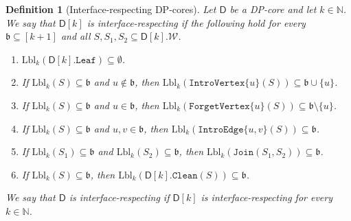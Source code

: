 \documentclass[11pt,a4paper]{article}
\newtheorem{definition}[theorem]{Definition}
\newcommand{\treewidthvalue}{k}
\newcommand{\N}{\mathbb{N}}
\newcommand{\abag}{\mathfrak{b}}
\newcommand{\introvertextype}[1]{\mathtt{IntroVertex}\{#1\}}
\newcommand{\forgetvertextype}[1]{\mathtt{ForgetVertex}\{#1\}}
\newcommand{\jointype}{\mathtt{Join}}
\newcommand{\introedgegeneric}[2]{\mathtt{IntroEdge}\{#1,#2\}}
\newcommand{\initialsetgeneric}{\mathtt{Leaf}}
\newcommand{\cleaningfunctioncore}{\mathtt{Clean}}
\newcommand{\vertexone}{u}
\newcommand{\vertextwo}{v}
\newcommand{\allwitnesses}{\mathcal{W}}
\newcommand{\dpcore}{\mathsf{D}}
\newcommand{\witnessset}{S}
\begin{document}
\begin{definition}[Interface-respecting DP-cores]
\label{definition:interface-respecting-dpcore}
Let $\dpcore$ be a DP-core and let $\treewidthvalue\in \N$. We say that $\dpcore[\treewidthvalue]$ is \emph{interface-respecting} if the following hold for every $\abag\subseteq [\treewidthvalue+1]$ and all $\witnessset,\witnessset_1,\witnessset_2\subseteq \dpcore[\treewidthvalue].\allwitnesses$.
\begin{enumerate}
\setlength\itemsep{0.25em}
\item \label{interface-respecting-initial}
$\mathrm{Lbl}_{\treewidthvalue}(\dpcore[\treewidthvalue].\initialsetgeneric)\subseteq \emptyset$.
\item \label{interface-respecting-introvertex}
If $\mathrm{Lbl}_{\treewidthvalue}(\witnessset)\subseteq \abag$ and $\vertexone\notin \abag$, then
$\mathrm{Lbl}_{\treewidthvalue}(\introvertextype{\vertexone}(\witnessset))\subseteq \abag\cup\{\vertexone\}$.
\item \label{interface-respecting-forgetvertex}
If $\mathrm{Lbl}_{\treewidthvalue}(\witnessset)\subseteq \abag$ and $\vertexone\in \abag$, then
$\mathrm{Lbl}_{\treewidthvalue}(\forgetvertextype{\vertexone}(\witnessset))\subseteq \abag\setminus\{\vertexone\}$.
\item \label{interface-respecting-introedge}
If $\mathrm{Lbl}_{\treewidthvalue}(\witnessset)\subseteq \abag$ and $\vertexone,\vertextwo\in \abag$, then
$\mathrm{Lbl}_{\treewidthvalue}(\introedgegeneric{\vertexone}{\vertextwo}(\witnessset))\subseteq \abag$.
\item \label{interface-respecting-join}
If $\mathrm{Lbl}_{\treewidthvalue}(\witnessset_1)\subseteq \abag$ and $\mathrm{Lbl}_{\treewidthvalue}(\witnessset_2)\subseteq \abag$, then
$\mathrm{Lbl}_{\treewidthvalue}(\jointype(\witnessset_1,\witnessset_2))\subseteq \abag$.
\item \label{interface-respecting-clean}
If $\mathrm{Lbl}_{\treewidthvalue}(\witnessset)\subseteq \abag$, then
$\mathrm{Lbl}_{\treewidthvalue}(\dpcore[\treewidthvalue].\cleaningfunctioncore(\witnessset))\subseteq \abag$.
\end{enumerate}
We say that $\dpcore$ is interface-respecting if $\dpcore[\treewidthvalue]$ is interface-respecting for every $\treewidthvalue\in \N$.
\end{definition}
\end{document}
